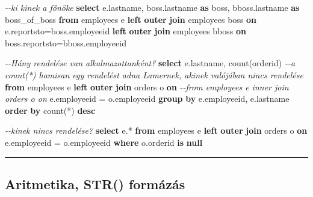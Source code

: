 \documentclass[
  magyar,
]{article}
\newenvironment{Shaded}{}{}
\newcommand{\CommentTok}[1]{\textcolor[rgb]{0.38,0.63,0.69}{\textit{#1}}}
\newcommand{\FunctionTok}[1]{\textcolor[rgb]{0.02,0.16,0.49}{#1}}
\newcommand{\KeywordTok}[1]{\textcolor[rgb]{0.00,0.44,0.13}{\textbf{#1}}}
\newcommand{\NormalTok}[1]{#1}
\newcommand{\OperatorTok}[1]{\textcolor[rgb]{0.40,0.40,0.40}{#1}}
\begin{document}
\begin{Shaded}
\begin{Highlighting}[]
\CommentTok{{-}{-}ki kinek a főnöke}
\KeywordTok{select}\NormalTok{ e.lastname, boss.lastname }\KeywordTok{as}\NormalTok{ boss, bboss.lastname }\KeywordTok{as}\NormalTok{ boss\_of\_boss}
\KeywordTok{from}\NormalTok{ employees e }\KeywordTok{left} \KeywordTok{outer} \KeywordTok{join}\NormalTok{ employees boss }\KeywordTok{on}\NormalTok{ e.reportsto}\OperatorTok{=}\NormalTok{boss.employeeid}
\KeywordTok{left} \KeywordTok{outer} \KeywordTok{join}\NormalTok{ employees bboss }\KeywordTok{on}\NormalTok{ boss.reportsto}\OperatorTok{=}\NormalTok{bboss.employeeid}

\CommentTok{{-}{-}Hány rendelése van alkalmazottanként?}
\KeywordTok{select}\NormalTok{ e.lastname, }\FunctionTok{count}\NormalTok{(orderid)}
\CommentTok{{-}{-}a count(*) hamisan egy rendelést adna Lamernek, akinek valójában nincs rendelése}
\KeywordTok{from}\NormalTok{ employees e }\KeywordTok{left} \KeywordTok{outer} \KeywordTok{join}\NormalTok{ orders o }\KeywordTok{on}
\CommentTok{{-}{-}from employees e inner join orders o on}
\NormalTok{e.employeeid }\OperatorTok{=}\NormalTok{ o.employeeid}
\KeywordTok{group} \KeywordTok{by}\NormalTok{ e.employeeid, e.lastname}
\KeywordTok{order} \KeywordTok{by} \FunctionTok{count}\NormalTok{(}\OperatorTok{*}\NormalTok{) }\KeywordTok{desc}

\CommentTok{{-}{-}kinek nincs rendelése?}
\KeywordTok{select}\NormalTok{ e.}\OperatorTok{*}
\KeywordTok{from}\NormalTok{ employees e }\KeywordTok{left} \KeywordTok{outer} \KeywordTok{join}\NormalTok{ orders o }\KeywordTok{on}
\NormalTok{e.employeeid }\OperatorTok{=}\NormalTok{ o.employeeid}
\KeywordTok{where}\NormalTok{ o.orderid }\KeywordTok{is} \KeywordTok{null}
\end{Highlighting}
\end{Shaded}

\begin{center}\rule{0.5\linewidth}{0.5pt}\end{center}

\subsection{Aritmetika, STR()
formázás}\label{aritmetika-str-formuxe1zuxe1s}
\end{document}
